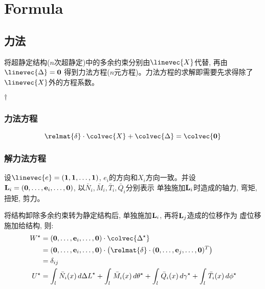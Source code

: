 \chapter{Formula}

\section{力法}

将超静定结构($n$次超静定)中的多余约束分别由$\displaystyle\linevec{X}$代替,%
再由$\displaystyle\linevec{\Delta} = {\bf 0}$%
得到力法方程($n$元方程)。力法方程的求解即需要先求得除了%
$\displaystyle\linevec{X}$外的方程系数。

\noindent$\dagger$

\subsection{力法方程}

\begin{equation}
\label{eq:lffc}
\relmat{\delta}\cdot\colvec{X} + \colvec{\Delta} = \colvec{\bf 0}
\end{equation}


\subsection{解力法方程}

\def\tempee#1{({\bf 0},\ldots, {\bf e}_{#1}, \ldots, {\bf 0})}
设$\linevec{e} = ({\bf 1}, {\bf 1}, \dots, {\bf 1})$, $e_i$的方向和$X_i$方向一致。并设%
${\bf L}_i = \tempee{i}$, 以${\bar N}_i, {\bar M}_i, {\bar T}_i, {\bar Q}_i$分别表示%
单独施加${\bf L}_i$时造成的轴力, 弯矩, 扭矩, 剪力。\par

将结构卸除多余约束转为静定结构后, 单独施加${\bf L}_i$, 再将${\bf L}_j$造成的位移作为%
虚位移施加给结构, 则:
\begin{subequations}
\begin{align}
W^\star &= \tempee{i}\cdot\colvec{\Delta^\star}\label{eq:axglf}\cr
        &= \tempee{i}\cdot\left(\relmat{\delta}\cdot{\tempee{j}^T}\right)\cr
        &= \delta_{ij}\\
U^\star &= \int_l\,{\bar N}_i(x)\,d{\Delta L}^\star +%
\int_l\,{\bar M}_i(x)\,d{\theta^\star} + \int_l\,{\bar Q}_i(x)\,d{\gamma^\star} +%
\int_l\,{\bar T}_i(x)\,d{\phi^\star}\label{eq:bxglf}\cr
\end{align}
\end{subequations}

